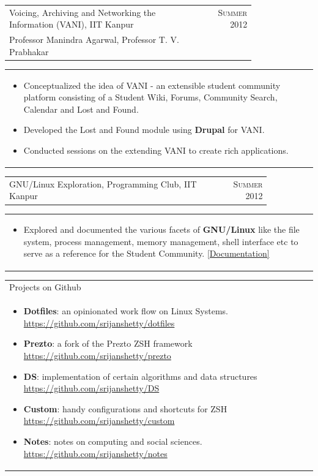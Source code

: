 \documentclass[a4paper,10pt]{article} %
\newcommand{\lproject}[4]{
    \begin{tabular}{p{0.80\linewidth}r}
        \textcolor{NavyBlue}{#2} & \multicolumn{1}{m{4cm}}{\raggedleft \textsc{#1}}\\
        #3
    \end{tabular}
    \begin{tabular}{p{\linewidth}}
    \vspace{-0.3cm}
        \footnotesize{#4}
    \end{tabular}
    \vspace{-0.5cm}
}
\newcommand{\iproject}[3]{
    \begin{tabular}{p{0.85\linewidth}r}
        \textcolor{NavyBlue}{#2} & \multicolumn{1}{m{3cm}}{\raggedleft \textsc{#1}}\\
    \end{tabular}
    \begin{tabular}{p{\linewidth}}
    \vspace{-0.3cm}
        \footnotesize{#3}
    \end{tabular}
    \vspace{-0.5cm}
}
\newcommand{\projectlist}[2]{
    \begin{tabular}{p{\linewidth}}
        \textcolor{NavyBlue}{#1}\\
        \vspace{-0.3cm}
        \footnotesize{#2}
    \end{tabular}
    \vspace{-0.4cm}
}
\begin{document}
\lproject {Summer 2012}
          {Voicing, Archiving and Networking the Information \textsc{(VANI)}, IIT Kanpur}
          {Professor Manindra Agarwal, Professor T. V. Prabhakar}
          {
              \begin{itemize}[leftmargin=0.5cm]
                  \item Conceptualized the idea of VANI - an extensible student community platform consisting
                      of a Student Wiki, Forums, Community Search, Calendar and Lost and Found.
                  \item Developed the Lost and Found module using \textbf{Drupal} for VANI.
                  \item Conducted sessions on the extending VANI to create rich applications.
              \end{itemize}
          }

\iproject {Summer 2012}
          {GNU/Linux Exploration, Programming Club, IIT Kanpur}
          {
              \begin{itemize}[leftmargin=0.5cm]
                  \item Explored and documented the various facets of \textbf{GNU/Linux} like the file system, process management, memory management,
                      shell interface etc to serve as a reference for the Student Community.
                      \href{https://docs.google.com/document/d/1ZHO9w36aoq3oaZBR4Um1AOmDfiTDAEgM6baQAu3icw4/edit?usp=sharing}{[Documentation]}
              \end{itemize}
          }

\projectlist {Projects on Github}
             {
                 \begin{itemize}[leftmargin=0.5cm]
                     \item \textbf{Dotfiles}: an opinionated work flow on Linux Systems.
                         \href{https://github.com/srijanshetty/dotfiles} {https://github.com/srijanshetty/dotfiles}
                     \item \textbf{Prezto}: a fork of the Prezto ZSH framework
                         \href{https://github.com/srijanshetty/prezto} {https://github.com/srijanshetty/prezto}
                     \item \textbf{DS}: implementation of certain algorithms and data structures
                         \href{https://github.com/srijanshetty/DS} {https://github.com/srijanshetty/DS}
                     \item \textbf{Custom}: handy configurations and shortcuts for ZSH
                         \href{https://github.com/srijanshetty/custom} {https://github.com/srijanshetty/custom}
                     \item \textbf{Notes}: notes on computing and social sciences.
                         \href{https://github.com/srijanshetty/notes} {https://github.com/srijanshetty/notes}
                 \end{itemize}
             }
\end{document}

